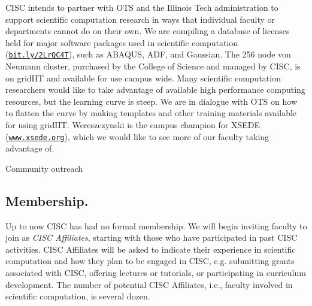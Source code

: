 \documentclass[12pt]{amsart}
\begin{document}
CISC intends to partner with OTS and the Illinois Tech administration to support scientific computation research in ways that individual faculty or departments cannot do on their own.  We are compiling a database of licenses held for major software packages used in scientific computation (\href{http://bit.ly/2LrQC4T}{\nolinkurl{bit.ly/2LrQC4T}}),  such as ABAQUS, ADF, and Gaussian.  The 256 node von Neumann cluster, purchased by the College of Science and managed by CISC, is on gridIIT and available for use campus wide.  Many scientific computation researchers would like to take advantage of available high performance computing resources, but the learning curve is steep.  We are in dialogue with OTS on how to flatten the curve by making templates and other training materials available for using gridIIT.  Wereszczynski is the campus champion for XSEDE (\href{https://www.xsede.org}{\nolinkurl{www.xsede.org}}), which we would like to see more of our faculty taking advantage of.

Community outreach

\subsection*{Membership.} 
Up to now CISC has had no formal membership.  We will begin inviting faculty to join as \emph{CISC Affiliates}, starting with those who have participated in past CISC activities.  CISC Affiliates will be asked to indicate their experience in scientific computation and how they plan to be engaged in CISC, e.g. submitting grants associated with CISC, offering lectures or tutorials, or participating in curriculum development. The number of potential CISC Affiliates, i.e., faculty involved in scientific computation, is several dozen.  
\end{document}
